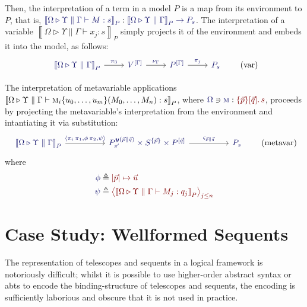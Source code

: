 \documentclass[11pt]{article}
\theoremstyle{definition}
\theoremstyle{remark}
\numberwithin{equation}{section}
\def\IModeColorName{MidnightBlue}
\def\OModeColorName{Maroon}
\newcommand\IMode[1]{{\color{\IModeColorName}{#1}}}
\newcommand\OMode[1]{{\color{\OModeColorName}{#1}}}
\newcommand\Of[2]{\IMode{#1}: \IMode{#2}}
\newcommand\MkValence[3]{%
  \ifthenelse{\equal{#1}{}}{}{%
    \{#1\}%
  }%
  \ifthenelse{\equal{#2}{}}{}{%
    [#2]%
  }.\, #3%
}
\newcommand\Lookup[3]{\IMode{#1}\ni\IMode{#2}:\OMode{#3}}
\newcommand\Tuple[1]{\left\langle#1 \right\rangle}
\newcommand\MV[1]{\textsc{#1}}
\newcommand\MApp[3]{#1\{#2\}(#3)}
\newcommand\Dom[1]{\left\vert#1\right\vert}
\newcommand\ADefine[2]{\IMode{#1}&\triangleq\OMode{#2}}
\newcommand\SemBrackets[1]{\left\llbracket#1\right\rrbracket}
\newcommand\Yoneda[1]{\boldsymbol{y} (#1)}
\begin{document}
Then, the interpretation of a term in a model $P$ is a map from its environment
to $P$, that is,
$\Of{\SemBrackets{\Omega\triangleright\Upsilon\parallel\Gamma\vdash
M:s}_P}{\SemBrackets{\Omega\triangleright\Upsilon\parallel\Gamma}_P\to P_s}$.
The interpretation of a variable
$\SemBrackets{\Omega\triangleright\Upsilon\parallel\Gamma\vdash x_j:s}_P$
simply projects it of the environment and embeds it into the
model, as follows:
\[
  \begin{tikzcd}[ampersand replacement = \&]
    {\IMode{\SemBrackets{\Omega\triangleright\Upsilon\parallel\Gamma}_P}} \arrow[r, "\IMode{\pi_3}"]
    \& {\IMode{V^{[\Gamma]}}} \arrow[r, "\IMode{\nu_{\Gamma}}"]
    \& {\IMode{P^{[\Gamma]}}} \arrow[r, "\IMode{\pi_j}"]
    \& \IMode{P_s}
  \end{tikzcd}
  \tag{var}
\]

The interpretation of metavariable applications
$\SemBrackets{\Omega\triangleright\Upsilon\parallel\Gamma\vdash
\MApp{\MV{m}_i}{u_0,\dots,u_m}{M_0,\dots,M_n} : s}_P$, where
$\Lookup{\Omega}{\MV{m}}{\MkValence{\vec{p}}{\vec{q}}{s}}$, proceeds by projecting the metavariable's interpretation from the environment and intantiating it via substitution:
\[
  \begin{tikzcd}[ampersand replacement = \&, sep=huge]
    {\IMode{\SemBrackets{\Omega\triangleright\Upsilon\parallel\Gamma}_P}}
          \arrow[r, "\IMode{\Tuple{\pi_i\,\pi_1, \phi\,\pi_2, \psi}}"]
    \& {\IMode{P_{s'}^{\Yoneda{\vec{p}\parallel\vec{q}}}\times S^{\{\vec{p}\}} \times P^{[\vec{q}]}}}
          \arrow[r, "\IMode{\varsigma_{\vec{p}\parallel\vec{q}}}"]
    \& \IMode{P_s}
  \end{tikzcd}
  \tag{metavar}
\]
where
\begin{align*}
  \ADefine{\phi}{
    \Dom{\vec{p}}\mapsto \vec{u}
  }\\
  \ADefine{\psi}{
    \Tuple{
      \SemBrackets{\Omega\triangleright\Upsilon\parallel\Gamma\vdash M_j:q_j}_P
    }_{j\leq n}
  }
\end{align*}


\section{Case Study: Wellformed Sequents}

The representation of telescopes and sequents in a logical framework is
notoriously difficult; whilst it is possible to use higher-order abstract
syntax or abts to encode the binding-structure of telescopes
and sequents, the encoding is sufficiently laborious and obscure that it is not
used in practice.
\end{document}
